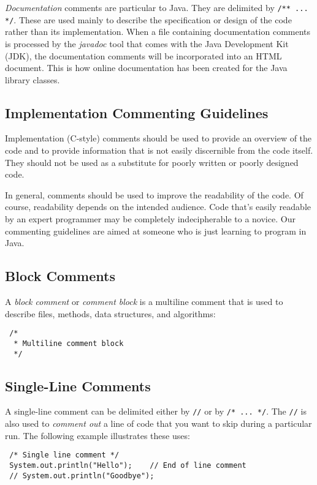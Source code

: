 {\it Documentation} comments are particular to Java.  They are
delimited by \verb|/** ... */|.  These are used mainly to describe the
specification or design of the code rather than its
implementation.  When a file containing documentation comments is
processed by the {\it javadoc} tool that comes with the Java
Development Kit (JDK), the documentation comments will be incorporated
into an HTML document.  This is how online documentation has been
created for the Java library classes.

\subsection*{Implementation Commenting Guidelines}
\noindent Implementation (C-style) comments should be used to provide an
overview of the code and to provide information that is not easily
discernible from the code itself.  They should not be used as a
substitute for poorly written or poorly designed code.


In general, comments should be used to improve the readability of the
code.  Of course, readability depends on the intended audience.   Code
that's easily readable by an expert programmer may be completely
indecipherable to a novice.  Our commenting guidelines are aimed at
someone who is just learning to program in Java.

\subsection*{Block Comments}
\noindent A {\it block comment} or {\it comment block} is a multiline
comment that is used to describe files, methods, data structures,
and algorithms:

\begin{jjjlisting}
\begin{lstlisting}
 /*
  * Multiline comment block
  */
\end{lstlisting}
\end{jjjlisting}

\subsection*{Single-Line Comments}
\noindent A single-line comment can be delimited either by \verb|//| or by
\verb|/* ... */|. The  \verb|//| is also used to {\it comment out}
a line of code that you want to skip during a particular run.  The
following example illustrates these uses:

\begin{jjjlisting}
\begin{lstlisting}
 /* Single line comment */
 System.out.println("Hello");    // End of line comment
 // System.out.println("Goodbye");
\end{lstlisting}
\end{jjjlisting}

